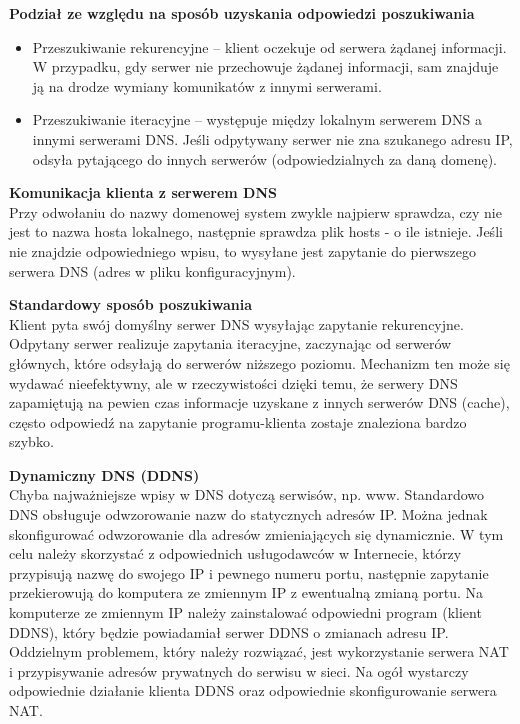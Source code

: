 \documentclass[../main.tex]{subfiles}
\begin{document}
    \textbf{Podział ze względu na sposób uzyskania odpowiedzi poszukiwania}
    \begin{itemize}
        \item Przeszukiwanie rekurencyjne – klient oczekuje od serwera żądanej informacji. W przypadku,
        gdy serwer nie przechowuje żądanej informacji, sam znajduje ją na drodze wymiany
        komunikatów z innymi serwerami.
        \item  Przeszukiwanie iteracyjne – występuje między lokalnym serwerem DNS a innymi serwerami
        DNS. Jeśli odpytywany serwer nie zna szukanego adresu IP, odsyła pytającego do innych
        serwerów (odpowiedzialnych za daną domenę).
    \end{itemize}

    \textbf{Komunikacja klienta z serwerem DNS}\\
    Przy odwołaniu do nazwy domenowej system zwykle najpierw sprawdza, czy nie jest to
    nazwa hosta lokalnego, następnie sprawdza plik hosts - o ile istnieje. Jeśli nie znajdzie odpowiedniego wpisu, to
    wysyłane jest zapytanie do pierwszego serwera DNS (adres w pliku
    konfiguracyjnym).

    \textbf{Standardowy sposób poszukiwania}\\
    Klient pyta swój domyślny serwer DNS wysyłając zapytanie rekurencyjne.
    Odpytany serwer realizuje zapytania iteracyjne, zaczynając od serwerów głównych, które
    odsyłają do serwerów niższego poziomu.
    Mechanizm ten może się wydawać nieefektywny, ale w rzeczywistości dzięki temu, że
    serwery DNS zapamiętują na pewien czas informacje uzyskane z innych serwerów DNS
    (cache), często odpowiedź na zapytanie programu-klienta zostaje znaleziona bardzo szybko.

    \textbf{Dynamiczny DNS (DDNS)}\\
    Chyba najważniejsze wpisy w DNS dotyczą serwisów, np. www. Standardowo DNS obsługuje
    odwzorowanie nazw do statycznych adresów IP. Można jednak skonfigurować odwzorowanie dla adresów zmieniających się
    dynamicznie. W tym celu należy skorzystać z odpowiednich usługodawców w Internecie,
    którzy przypisują nazwę do swojego IP i pewnego numeru portu, następnie zapytanie
    przekierowują do komputera ze zmiennym IP z ewentualną zmianą portu. Na komputerze ze zmiennym IP należy
    zainstalować odpowiedni program (klient DDNS), który będzie powiadamiał serwer DDNS o
    zmianach adresu IP.
    Oddzielnym problemem, który należy rozwiązać, jest wykorzystanie serwera NAT i
    przypisywanie adresów prywatnych do serwisu w sieci. Na ogół wystarczy odpowiednie
    działanie klienta DDNS oraz odpowiednie skonfigurowanie serwera NAT.
\end{document}
